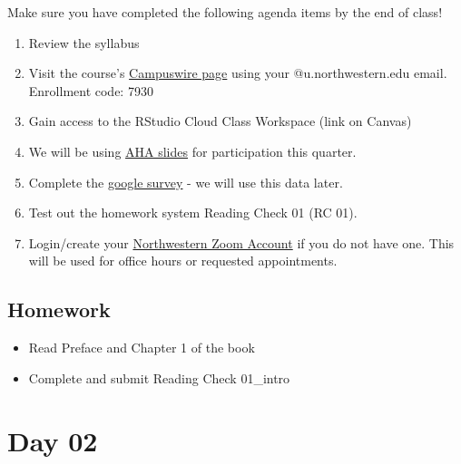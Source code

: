 \documentclass[
  letterpaper,
  DIV=11,
  numbers=noendperiod]{scrreprt}
\providecommand{\tightlist}{%
  \setlength{\itemsep}{0pt}\setlength{\parskip}{0pt}}\usepackage{longtable,booktabs,array}
\begin{document}
\begin{tcolorbox}[enhanced jigsaw, breakable, colback=white, bottomrule=.15mm, leftrule=.75mm, colframe=quarto-callout-note-color-frame, arc=.35mm, rightrule=.15mm, toprule=.15mm, left=2mm, opacityback=0]

Make sure you have completed the following agenda items by the end of
class!

\begin{enumerate}
\def\labelenumi{\arabic{enumi}.}
\tightlist
\item
  Review the syllabus
\item
  Visit the course's
  \href{https://campuswire.com/p/G88B46A25}{Campuswire page} using your
  @u.northwestern.edu email. Enrollment code: 7930
\item
  Gain access to the RStudio Cloud Class Workspace (link on Canvas)
\item
  We will be using \href{https://ahaslides.com/202PART1}{AHA slides} for
  participation this quarter.
\item
  Complete the
  \href{https://docs.google.com/forms/d/e/1FAIpQLSfdKddsg7CoaY7WwM2gc9iiUKr8mtSRbKQ8oLAgD9cv0ugJRw/viewform?usp=sf_link}{google
  survey} - we will use this data later.
\item
  Test out the homework system Reading Check 01 (RC 01).
\item
  Login/create your \href{https://northwestern.zoom.us/}{Northwestern
  Zoom Account} if you do not have one. This will be used for office
  hours or requested appointments.
\end{enumerate}

\end{tcolorbox}

\hypertarget{homework}{%
\section*{Homework}\label{homework}}

\begin{itemize}
\item
  Read Preface and Chapter 1 of the book
\item
  Complete and submit Reading Check 01\_intro
\end{itemize}


\hypertarget{day-02}{%
\chapter*{Day 02}\label{day-02}}
\end{document}
